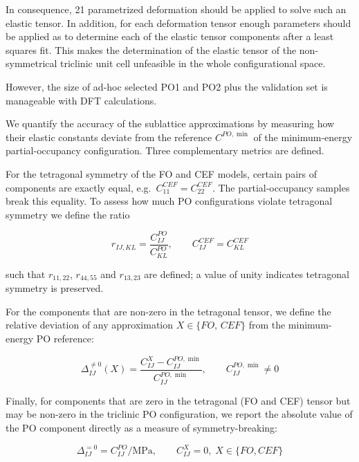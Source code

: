 \documentclass[superscriptaddress, 12pt]{revtex4-2}%
\begin{document}
In consequence, 21 parametrized deformation should be applied to solve such an elastic tensor. 
In addition, for each deformation tensor enough parameters should be applied as to determine each of the elastic tensor components after a least squares fit.
This makes the determination of the elastic tensor of the non-symmetrical triclinic unit cell unfeasible in the whole configurational space.

However, the size of ad-hoc selected PO1 and PO2 plus the validation set is manageable with DFT calculations.

We quantify the accuracy of the sublattice approximations by measuring how their elastic constants deviate from the reference $C^{PO,\min}$ of the minimum-energy partial-occupancy configuration.
Three complementary metrics are defined.

For the tetragonal symmetry of the FO and CEF models, certain pairs of components are exactly equal, e.g.\ $C_{11}^{CEF} = C_{22}^{CEF}$.
The partial-occupancy samples break this equality.
To assess how much PO configurations violate tetragonal symmetry we define the ratio

\begin{equation}\label{eqn:ratios}
    r_{IJ,KL} = \dfrac{C^{PO}_{IJ}}{C^{PO}_{KL}}, \qquad C^{CEF}_{IJ} = C^{CEF}_{KL} 
\end{equation}

\noindent such that $r_{11,22}$, $r_{44,55}$ and $r_{13,23}$ are defined; a value of unity indicates tetragonal symmetry is preserved.

For the components that are non-zero in the tetragonal tensor, we define the relative deviation of any approximation $X \in \{FO,\,CEF\}$ from the minimum-energy PO reference:

\begin{equation}\label{eqn:deviatiosnonzero}
\Delta^{\neq 0} _{IJ}(X) = \dfrac{C_{IJ}^{X} - C_{IJ}^{PO,\min}}{C_{IJ}^{PO,\min}}, \qquad C_{IJ}^{PO,\min} \neq 0
\end{equation}

Finally, for components that are zero in the tetragonal (FO and CEF) tensor but may be non-zero in the triclinic PO configuration, we report the absolute value of the PO component directly as a measure of symmetry-breaking:

\begin{equation}\label{eqn:deviationsarezero}
\Delta^{= 0} _{IJ} = C^{PO}_{IJ}/\text{MPa}, \qquad C^{X}_{IJ} = 0,\; X\in\{FO,CEF\}
\end{equation}
\end{document}
